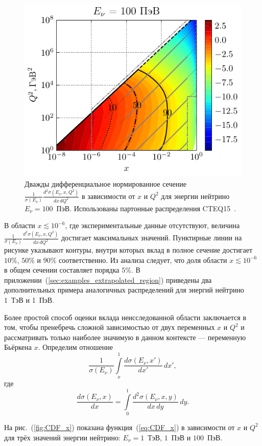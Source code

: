 \begin{figure}[!h]
\centering
\includegraphics[width=0.8\linewidth]{images/NuProp/cdfxq2_cc_proton_CT10nlo_14_100000000.pdf}
\caption{Дважды дифференциальное нормированное сечение 
$\frac{1}{\sigma(E_\nu)}\frac{d^2\sigma(E_\nu,x,Q^2)}{dx\,dQ^2}$ 
в зависимости от $x$ и $Q^2$ для энергии нейтрино $E_{\nu}=100$~ПэВ. 
Использованы партонные распределения CTEQ15~\cite{ncteq15}.}
\label{fig:diff_xsec_100PeV}
\end{figure}

В области $x \lesssim 10^{-6}$, где экспериментальные данные отсутствуют, величина 
$\frac{1}{\sigma(E_\nu)}\frac{d^2\sigma(E_\nu,x,Q^2)}{dx\,dQ^2}$ 
достигает максимальных значений. 
Пунктирные линии на рисунке указывают контуры, внутри которых вклад в полное сечение достигает $10\%$, $50\%$ и $90\%$ соответственно. 
Из анализа следует, что доля области $x \lesssim 10^{-6}$ в общем сечении составляет порядка $5\%$. 
В приложении~(\ref{sec:examples_extrapolated_region}) приведены два дополнительных примера аналогичных распределений для энергий нейтрино 1~ТэВ и 1~ПэВ.

Более простой способ оценки вклада неисследованной области заключается в том, чтобы пренебречь сложной зависимостью от двух переменных $x$ и $Q^2$ и рассматривать только наиболее значимую в данном контексте — переменную Бьёркена $x$. 
Определим отношение
\begin{equation}
\frac{1}{\sigma(E_\nu)}\int\limits_{x}^1 \frac{d\sigma(E_\nu,x')}{dx'}\,dx',
\label{eq:CDF_x}
\end{equation}
где
\[
\frac{d\sigma(E_\nu,x)}{dx} = \int\limits_0^{1} \frac{d^2\sigma(E_\nu,x,y)}{dx\,dy}\,dy.
\]

На рис.~(\ref{fig:CDF_x}) показана функция~(\ref{eq:CDF_x}) в зависимости от $x$ и $Q^2$ для трёх значений энергии нейтрино: $E_{\nu} = 1$~ТэВ, $1$~ПэВ и $100$~ПэВ.


